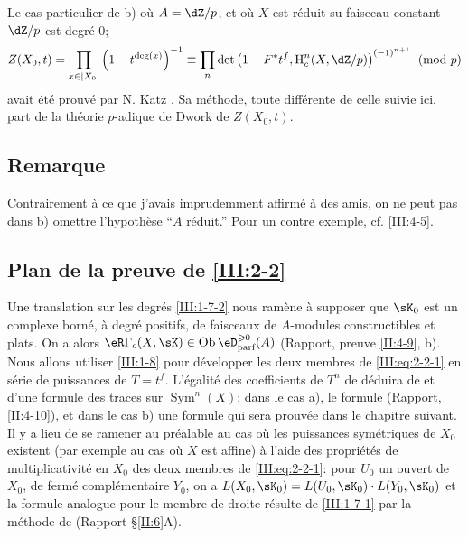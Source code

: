 Le cas particulier de b) où $A=\dZ/p$, et où $X$ est réduit su faisceau 
constant $\dZ/p$ est degré $0$;
\[
  Z(X_0,t) = \prod_{x\in |X_0|} \left(1-t^{\deg(x)}\right)^{-1}
      \equiv \prod_n \det\left(1-F^* t^f,\h_c^n(X,\dZ/p)\right)^{(-1)^{n+1}} \pmod p
\]
avait été prouvé par N. Katz \cite[XXII 3.1]{sga7}. Sa méthode, toute 
différente de celle suivie ici, part de la théorie $p$-adique de Dwork de 
$Z(X_0,t)$. 





\subsection{Remarque}\label{III:2-7}


Contrairement à ce que j'avais imprudemment affirmé à des amis, on ne 
peut pas dans b) omettre l'hypothèse ``$A$ réduit.'' Pour un contre 
exemple, cf. \ref{III:4-5}. 





\subsection{Plan de la preuve de \ref{III:2-2}}\label{III:2-8}

Une translation sur les degrés \ref{III:1-7-2} nous ramène à supposer 
que $\sK_0$ est un complexe borné, à degré positifs, de faisceaux de 
$A$-modules constructibles et plats. On a alors 
$\eR\Gamma_c(X,\sK)\in \ob\eD_\text{parf}^{\geqslant 0}(A)$ (Rapport, 
preuve \ref{II:4-9}, b). Nous allons utiliser \ref{III:1-8} pour développer 
les deux membres de \eqref{III:eq:2-2-1} en série de puissances de $T=t^f$. 
L'égalité des coefficients de $T^n$ de déduira de 
\cite[XVII 5.5.21]{sga4} et d'une formule des traces sur 
$\operatorname{Sym}^n(X)$; dans le cas a), le formule (Rapport, 
\ref{II:4-10}), et dans le cas b) une formule qui sera prouvée dans le 
chapitre suivant. Il y a lieu de se ramener au préalable au cas où les 
puissances symétriques de $X_0$ existent (par exemple au cas où $X$ est 
affine) à l'aide des propriétés de multiplicativité en $X_0$ des deux 
membres de \eqref{III:eq:2-2-1}: pour $U_0$ un ouvert de $X_0$, de fermé 
complémentaire $Y_0$, on a $L(X_0,\sK_0)=L(U_0,\sK_0)\cdot L(Y_0,\sK_0)$ et 
la formule analogue pour le membre de droite résulte de \ref{III:1-7-1} 
par la méthode de (Rapport \S\ref{II:6}A). 





